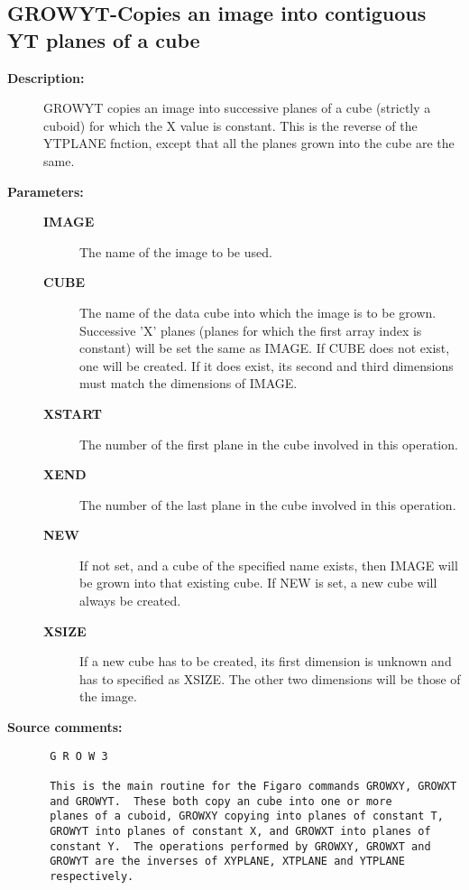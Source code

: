 \subsection{GROWYT-\label{GROWYT}Copies an image into contiguous YT planes of a cube}
\begin{description}

\item [{\bf Description:}]
 GROWYT copies an image into successive planes of a cube (strictly
 a cuboid) for which the X value is constant.  This is the reverse
 of the YTPLANE fnction, except that all the planes grown into the
 cube are the same.

\item [{\bf Parameters:}]
\begin{description}
\item [{\bf IMAGE}]
 The name of the image to be used.
\item [{\bf CUBE}]
 The name of the data cube into which the image
 is to be grown.  Successive 'X' planes (planes for which
 the first array index is constant) will be set the same
 as IMAGE.  If CUBE does not exist, one will be created.
 If it does exist, its second and third dimensions must
 match the dimensions of IMAGE.
\item [{\bf XSTART}]
 The number of the first plane in the cube
 involved in this operation.
\item [{\bf XEND}]
 The number of the last plane in the cube
 involved in this operation.
\item [{\bf NEW}]
 If not set, and a cube of the specified name exists,
 then IMAGE will be grown into that existing cube.
 If NEW is set, a new cube will always be created.
\item [{\bf XSIZE}]
 If a new cube has to be created, its first dimension
 is unknown and has to specified as XSIZE.  The other
 two dimensions will be those of the image.
\end{description}

\item [{\bf Source comments:}]
\begin{verbatim}
 G R O W 3

 This is the main routine for the Figaro commands GROWXY, GROWXT
 and GROWYT.  These both copy an cube into one or more
 planes of a cuboid, GROWXY copying into planes of constant T,
 GROWYT into planes of constant X, and GROWXT into planes of
 constant Y.  The operations performed by GROWXY, GROWXT and
 GROWYT are the inverses of XYPLANE, XTPLANE and YTPLANE
 respectively.


\end{verbatim}
\end{description}
